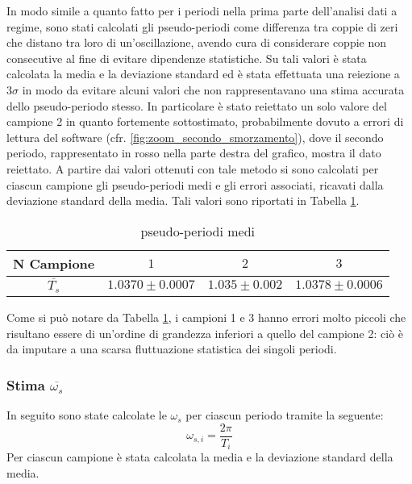 \documentclass[a4paper,11pt,oneside]{article}
\begin{document}
In modo simile a quanto fatto per i periodi nella prima parte dell'analisi dati a regime, sono stati calcolati gli pseudo-periodi come differenza tra coppie di zeri che distano tra loro di un'oscillazione, avendo cura di considerare coppie non consecutive al fine di evitare dipendenze statistiche. Su tali valori è stata calcolata la media e la deviazione standard ed è stata effettuata una reiezione a $3\sigma$ in modo da evitare alcuni valori che non rappresentavano una stima accurata dello pseudo-periodo stesso. In particolare è stato reiettato un solo valore del campione 2 in quanto fortemente sottostimato, probabilmente dovuto a errori di lettura del software (cfr. \ref{fig:zoom_secondo_smorzamento}), dove il secondo periodo, rappresentato in rosso nella parte destra del grafico, mostra il dato reiettato.
A partire dai valori ottenuti con tale metodo si sono calcolati per ciascun campione  gli pseudo-periodi medi e gli errori associati, ricavati dalla deviazione standard della media. Tali valori sono riportati in Tabella \ref{tab:pseudo-periodi_medi}.

\begin{table}[h!]
    \centering
    \begin{tabular}{|c|c|c|c|}
        \hline
        \textbf{N Campione} & $1$ & $2$ & $3$\\ \hline
        \textbf{$\overline{T_s}$} & $1.0370\pm0.0007$ & $1.035\pm0.002$ & $1.0378\pm0.0006$\\ \hline
    \end{tabular}
    \caption{pseudo-periodi medi}
    \label{tab:pseudo-periodi_medi}
\end{table}

Come si può notare da Tabella \ref{tab:pseudo-periodi_medi}, i campioni 1 e 3 hanno errori molto piccoli che risultano essere di un'ordine di grandezza inferiori a quello del campione 2: ciò è da imputare a una scarsa fluttuazione statistica dei singoli periodi.

\subsubsection{Stima $\overline{\omega_s}$}
In seguito sono state calcolate le $\omega_s$ per ciascun periodo tramite la seguente:
\begin{equation*}
    \omega_{s,i} = \frac{2\pi}{T_i}
\end{equation*}
Per ciascun campione è stata calcolata la media e la deviazione standard della media.
\end{document}

